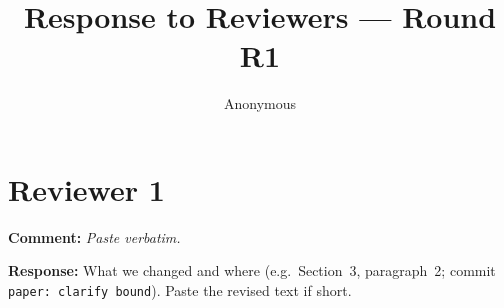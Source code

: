 \documentclass[11pt]{article}
\title{Response to Reviewers --- Round R1}
\author{Anonymous}
\begin{document}
\maketitle
\section*{Reviewer 1}
\textbf{Comment:} \emph{Paste verbatim.}

\textbf{Response:} What we changed and where (e.g.\ Section~3, paragraph~2;
commit \texttt{paper: clarify bound}). Paste the revised text if short.
\end{document}
